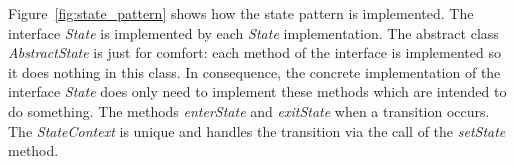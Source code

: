 \documentclass[fontsize=12pt,
               paper=a4,
               twoside=false,
               parskip=half,
               ]{scrartcl}
\begin{document}
Figure~\ref{fig:state_pattern} shows how the state pattern is implemented. The interface \emph{State} is implemented by each \emph{State} implementation. The abstract class \emph{AbstractState} is just for comfort: each method of the interface is implemented so it does nothing in this class. In consequence, the concrete implementation of the interface \emph{State} does only need to implement these methods which are intended to do something. The methods \emph{enterState} and \emph{exitState} when a transition occurs. The \emph{StateContext} is unique and handles the transition via the call of the \emph{setState} method.
\end{document}
